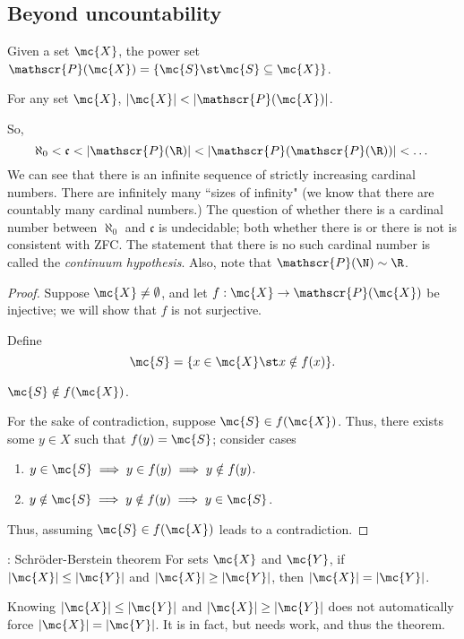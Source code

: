 \subsection{Beyond uncountability}
Given a set \(\mc{X}\), the power set \(\mathscr{P}(\mc{X})=\{\mc{S}\st\mc{S}\subseteq \mc{X}\}\).
\begin{nproposition}{}
	For any set \(\mc{X}\), \(|\mc{X}|<|\mathscr{P}(\mc{X})|\).
	
	\medskip
	
	So, 
	\begin{equation*}
		\aleph_0<\mathfrak{c}<|\mathscr{P}(\R)|<|\mathscr{P}(\mathscr{P}(\R))|<\dots
	\end{equation*}
	We can see that there is an infinite sequence of strictly increasing cardinal numbers. There are infinitely many ``sizes of infinity" (we know that there are countably many cardinal numbers.) The question of whether there is a cardinal number between \(\aleph_0\) and \(\mathfrak{c}\) is undecidable; both whether there is or there is not is consistent with ZFC. The statement that there is no such cardinal number is called the \textit{continuum hypothesis}. Also, note that \(\mathscr{P}(\N)\sim \R\).
\end{nproposition}
\begin{proof}
	Suppose \(\mc{X}\neq\emptyset\), and let \(f:\mc{X}\to\mathscr{P}(\mc{X})\) be injective; we will show that \(f\) is not surjective.
	
	\medskip
	
	Define 
	\begin{equation*}
		\mc{S}=\{x\in \mc{X}\st x\notin f(x)\}.
	\end{equation*}
	\begin{claim}
		\(\mc{S}\notin f(\mc{X})\).
	\end{claim}
	For the sake of contradiction, suppose \(\mc{S}\in f(\mc{X})\). Thus, there exists some \(y\in X\) such that \(f(y)=\mc{S}\); consider cases 
	\begin{enumerate}
		\item \(y\in \mc{S}\implies y\in f(y)\implies y\notin f(y)\).
		
		\item \(y\notin \mc{S}\implies y\notin f(y)\implies y\in \mc{S}\).
	\end{enumerate}
	Thus, assuming \(\mc{S}\in f(\mc{X})\) leads to a contradiction.
\end{proof}
\begin{ntheorem}{: Schr\"oder-Berstein theorem}
	For sets \(\mc{X}\) and \(\mc{Y}\), if \(|\mc{X}|\leq |\mc{Y}|\) and \(|\mc{X}|\geq |\mc{Y}|\), then \(|\mc{X}|=|\mc{Y}|\).
\end{ntheorem}
\begin{note}
	Knowing \(|\mc{X}|\leq |\mc{Y}|\) and \(|\mc{X}|\geq |\mc{Y}|\) does not automatically force \(|\mc{X}|=|\mc{Y}|\). It is in fact, but needs work, and thus the theorem.
\end{note}